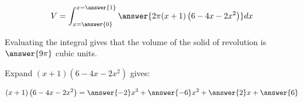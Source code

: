 \documentclass{ximera}
\begin{document}
\begin{exercise}
	\[
	V= \int_{x=\answer{0}}^{x=\answer{1}}
	\answer{2\pi (x+1)\left(6-4x-2x^2 \right)} dx
	\]

\begin{exercise}
Evaluating the integral gives that the volume of the solid of revolution is $\answer{9 \pi}$ cubic units.

\begin{hint}
Expand $(x+1)\left(6-4x-2x^2 \right)$ gives:

\[
(x+1)\left(6-4x-2x^2 \right) = \answer{-2}x^3+\answer{-6}x^2+\answer{2}x+\answer{6}
\]
\end{hint}
\end{exercise}


\end{exercise}
\end{document}
